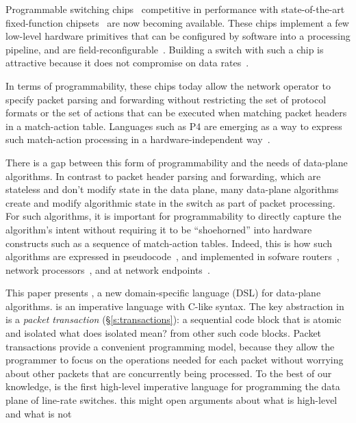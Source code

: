 Programmable switching chips~\cite{flexpipe, xpliant, rmt, corsa,
  uadp, algo_logic} competitive in performance with state-of-the-art
fixed-function chipsets~\cite{trident, tomahawk, mellanox} are now
becoming available. These chips implement a few low-level hardware
primitives that can be configured by software into a processing
pipeline, and are
field-reconfigurable~\cite{xpliant_sdk,xpliant_sdk2,intel_sdk}. Building
a switch with such a chip is attractive because it does not compromise
on data rates~\cite{rmt}.



In terms of programmability, these chips today allow the network
operator to specify packet parsing and forwarding without restricting
the set of protocol formats or the set of actions that can be executed
when matching packet headers in a match-action table. Languages such
as P4 are emerging as a way to express such match-action processing in
a hardware-independent way~\cite{p4,p4spec,dc_p4}.

There is a gap between this form of programmability and the needs of
data-plane algorithms.
In contrast to packet header parsing and forwarding, which are
stateless and don't modify state in the data plane, many data-plane
algorithms create and modify algorithmic state in the switch as part
of packet processing. For such algorithms, it is important for
programmability to directly capture the algorithm's intent without
requiring it to be ``shoehorned'' into hardware constructs such as a
sequence of match-action tables. Indeed, this is how such algorithms
are expressed in pseudocode~\cite{red, csfq, codel_code, avq, blue},
and implemented in sofware routers~\cite{click, dpdk, routebricks},
network processors~\cite{packetc, nova}, and at network
endpoints~\cite{qdisc}.

This paper presents \pktlanguage, a new domain-specific language (DSL)
for data-plane algorithms.  \pktlanguage is an imperative language
with C-like syntax. The key abstraction in \pktlanguage is a {\em
  packet transaction} (\S\ref{s:transactions}): a sequential code
block that is atomic and isolated \ac{what does isolated mean?}
from other such code blocks. Packet
transactions provide a convenient programming model, because they
allow the programmer to focus on the operations needed for each packet
without worrying about other packets that are concurrently being
processed. To the best of our knowledge, \pktlanguage is the first
high-level imperative language for programming the data plane of
line-rate switches. \ac{this might open arguments about what is high-level
and what is not}

